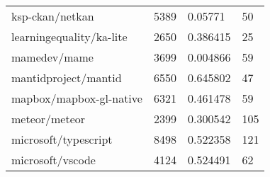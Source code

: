 \begin{table}[]
\begin{tabular}{llll}
ksp-ckan/netkan                             & 5389                               & 0.05771                                                                                                           & 50                                                                                                            \\
learningequality/ka-lite                    & 2650                               & 0.386415                                                                                                          & 25                                                                                                            \\
mamedev/mame                                & 3699                               & 0.004866                                                                                                          & 59                                                                                                            \\
mantidproject/mantid                        & 6550                               & 0.645802                                                                                                          & 47                                                                                                            \\
mapbox/mapbox-gl-native                     & 6321                               & 0.461478                                                                                                          & 59                                                                                                            \\
meteor/meteor                               & 2399                               & 0.300542                                                                                                          & 105                                                                                                           \\
microsoft/typescript                        & 8498                               & 0.522358                                                                                                          & 121                                                                                                           \\
microsoft/vscode                            & 4124                               & 0.524491                                                                                                          & 62                                                                                                            \\

\end{tabular}
\end{table}
